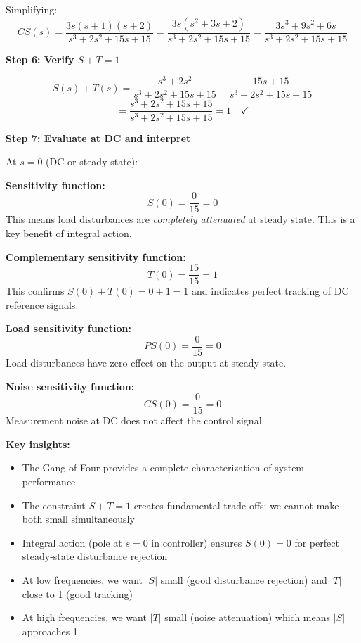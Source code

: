 \documentclass[11pt,a4paper]{article}
\begin{document}
Simplifying:
\begin{equation}
  CS(s) = \frac{3s(s+1)(s+2)}{s^3 + 2s^2 + 15s + 15} = \frac{3s(s^2+3s+2)}{s^3 + 2s^2 + 15s + 15} = \frac{3s^3 + 9s^2 + 6s}{s^3 + 2s^2 + 15s + 15}
\end{equation}

\textbf{Step 6: Verify $S + T = 1$}

\begin{equation}
  S(s) + T(s) = \frac{s^3 + 2s^2}{s^3 + 2s^2 + 15s + 15} + \frac{15s + 15}{s^3 + 2s^2 + 15s + 15}
\end{equation}
\begin{equation}
  = \frac{s^3 + 2s^2 + 15s + 15}{s^3 + 2s^2 + 15s + 15} = 1 \quad \checkmark
\end{equation}

\textbf{Step 7: Evaluate at DC and interpret}

At $s = 0$ (DC or steady-state):

\textbf{Sensitivity function:}
\begin{equation}
  S(0) = \frac{0}{15} = 0
\end{equation}
This means load disturbances are \emph{completely attenuated} at steady state. This is a key benefit of integral action.

\textbf{Complementary sensitivity function:}
\begin{equation}
  T(0) = \frac{15}{15} = 1
\end{equation}
This confirms $S(0) + T(0) = 0 + 1 = 1$ and indicates perfect tracking of DC reference signals.

\textbf{Load sensitivity function:}
\begin{equation}
  PS(0) = \frac{0}{15} = 0
\end{equation}
Load disturbances have zero effect on the output at steady state.

\textbf{Noise sensitivity function:}
\begin{equation}
  CS(0) = \frac{0}{15} = 0
\end{equation}
Measurement noise at DC does not affect the control signal.

\textbf{Key insights:}
\begin{itemize}
  \item The Gang of Four provides a complete characterization of system performance
  \item The constraint $S + T = 1$ creates fundamental trade-offs: we cannot make both small simultaneously
  \item Integral action (pole at $s=0$ in controller) ensures $S(0) = 0$ for perfect steady-state disturbance rejection
  \item At low frequencies, we want $|S|$ small (good disturbance rejection) and $|T|$ close to 1 (good tracking)
  \item At high frequencies, we want $|T|$ small (noise attenuation) which means $|S|$ approaches 1
\end{itemize}
\end{document}
